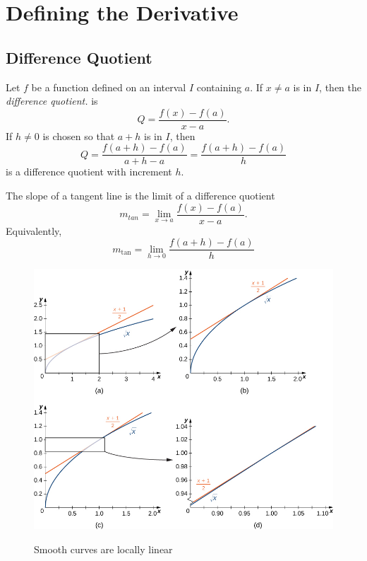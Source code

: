 
\hypertarget{defining-the-derivative}{%
\section{Defining the Derivative}\label{defining-the-derivative}}

\hypertarget{difference-quotient}{%
\subsection{Difference Quotient}\label{difference-quotient}}

Let \(f\) be a function defined on an interval \(I\) containing \(a\).
If \(x\neq a\) is in \(I\), then the \emph{difference quotient.} is \[
Q=\frac{f(x)-f(a)}{x-a}.
\] If \(h\neq 0\) is chosen so that \(a+h\) is in \(I\), then \[
Q=\frac{f(a+h)-f(a)}{a+h-a}=\frac{f(a+h)-f(a)}{h}
\] is a difference quotient with increment \(h\).

The slope of a tangent line is the limit of a difference quotient \[
m_{t a n}=\lim\limits_{x \to a} \frac{f(x)-f(a)}{x-a} .
\] Equivalently, \[
m_{\tan }=\lim\limits_{h \to 0} \frac{f(a+h)-f(a)}{h}
\]

\begin{figure}[h!]
\centering
\includegraphics[width=\textwidth]{img/locally-linear.jpeg}
\par Smooth curves are locally linear
\end{figure}


